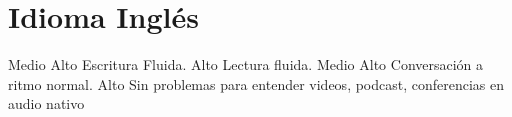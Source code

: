 \documentclass[draft,color,12pt,letterpaper,sans]{moderncv}
\begin{document}
\section{Idioma Ingl\'es}
{Medio Alto}
{Escritura Fluida.}
{Alto}
{Lectura fluida.}
{Medio Alto}
{Conversaci\'on a ritmo normal.}
{Alto}
{Sin problemas para entender videos, podcast, conferencias en audio nativo}









\end{document}
